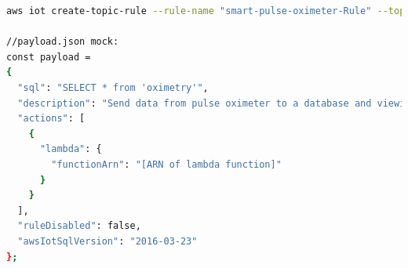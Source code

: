 \begin{lstlisting}[frame=single, language=bash, caption=Sette opp en businessregel i AWS IoT, label=lst:aws_business]
aws iot create-topic-rule --rule-name "smart-pulse-oximeter-Rule" --topic-rule-payload "file://payload.json"

//payload.json mock:
const payload =
{
  "sql": "SELECT * from 'oximetry'",
  "description": "Send data from pulse oximeter to a database and viewing tool",
  "actions": [
    {
      "lambda": {
        "functionArn": "[ARN of lambda function]"
      }
    }
  ],
  "ruleDisabled": false,
  "awsIotSqlVersion": "2016-03-23"
};
\end{lstlisting}


